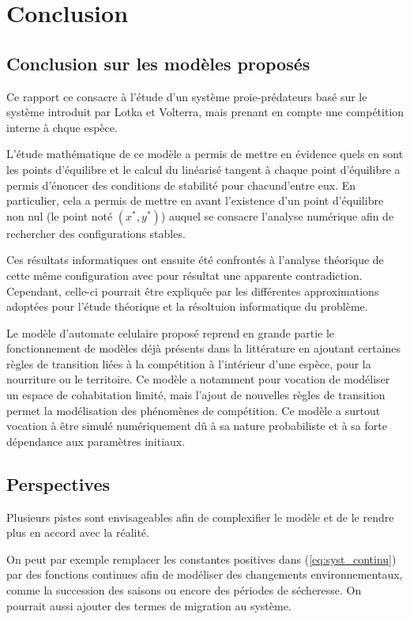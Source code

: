 \chapter{Conclusion}
\label{ch:Conclusion} 

\section{Conclusion sur les modèles proposés}

Ce rapport ce consacre à l'étude d'un système proie-prédateurs basé sur le système introduit par Lotka et Volterra, mais prenant en compte une compétition interne à chque espèce. 

L'étude mathématique de ce modèle a permis de mettre en évidence quels en sont les points d'équilibre et le calcul du linéarisé tangent à chaque point d'équilibre a permis d'énoncer des conditions de stabilité pour chacund'entre eux. En particulier, cela a permis de mettre en avant l'existence d'un point d'équilibre non nul (le point noté $(x^*, y^*)$) auquel se consacre l'analyse numérique afin de rechercher des configurations stables.

Ces résultats informatiques ont ensuite été confrontés à l'analyse théorique de cette même configuration avec pour résultat une apparente contradiction. Cependant, celle-ci pourrait être expliquée par les différentes approximations adoptées pour l'étude théorique et la résoltuion informatique du problème.

\vspace{0.3cm}
Le modèle d'automate celulaire proposé reprend en grande partie le fonctionnement de modèles déjà présents dans la littérature en ajoutant certaines règles de transition liées à la compétition à l'intérieur d'une espèce, pour la nourriture ou le territoire. Ce modèle a notamment pour vocation de modéliser un espace de cohabitation limité, mais l'ajout de nouvelles règles de transition permet la modélisation des phénomènes de compétition. Ce modèle a surtout vocation à être simulé numériquement dû à sa nature probabiliste et à sa forte dépendance aux paramètres initiaux.

\section{Perspectives}

Plusieurs pistes sont envisageables afin de complexifier le modèle et de le rendre plus en accord avec la réalité.

On peut par exemple remplacer les constantes positives dans (\ref{eq:syst_continu}) par des fonctions continues afin de modéliser des changements environnementaux, comme la succession des saisons ou encore des périodes de sécheresse. On pourrait aussi ajouter des termes de migration au système.

